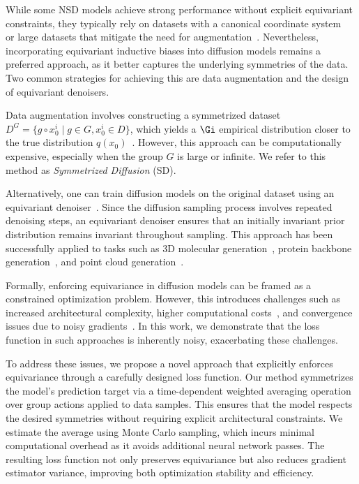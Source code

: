 While some NSD models achieve strong performance without explicit equivariant constraints, they typically rely on datasets with a canonical coordinate system~ or large datasets that mitigate the need for augmentation~. Nevertheless, incorporating equivariant inductive biases into diffusion models remains a preferred approach, as it better captures the underlying symmetries of the data. Two common strategies for achieving this are data augmentation and the design of equivariant denoisers.

Data augmentation involves constructing a symmetrized dataset \(D^G = \{g \circ x_0^i \mid g \in G, x_0^i \in D\}\), which yields a \(\Gi\) empirical distribution closer to the true distribution \(q(x_0)\)~. However, this approach can be computationally expensive, especially when the group \(G\) is large or infinite. We refer to this method as \emph{Symmetrized Diffusion} (SD).

Alternatively, one can train diffusion models on the original dataset using an equivariant denoiser~. Since the diffusion sampling process involves repeated denoising steps, an equivariant denoiser ensures that an initially invariant prior distribution remains invariant throughout sampling. This approach has been successfully applied to tasks such as 3D molecular generation~, protein backbone generation~, and point cloud generation~.

Formally, enforcing equivariance in diffusion models can be framed as a constrained optimization problem. However, this introduces challenges such as increased architectural complexity, higher computational costs~, and convergence issues due to noisy gradients~. In this work, we demonstrate that the loss function in such approaches is inherently noisy, exacerbating these challenges.

To address these issues, we propose a novel approach that explicitly enforces equivariance through a carefully designed loss function. Our method symmetrizes the model's prediction target via a time-dependent weighted averaging operation over group actions applied to data samples. This ensures that the model respects the desired symmetries without requiring explicit architectural constraints. We estimate the average using Monte Carlo sampling, which incurs minimal computational overhead as it avoids additional neural network passes. The resulting loss function not only preserves equivariance but also reduces gradient estimator variance, improving both optimization stability and efficiency.

